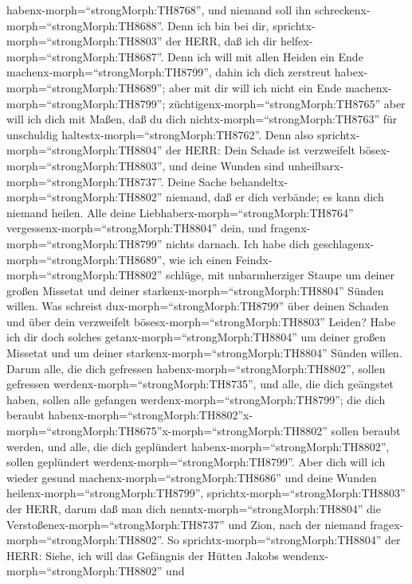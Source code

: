 habenx-morph=``strongMorph:TH8768'', und niemand soll ihn
schreckenx-morph=``strongMorph:TH8688''.  Denn ich bin bei
dir, sprichtx-morph=``strongMorph:TH8803'' der HERR, daß ich dir
helfex-morph=``strongMorph:TH8687''. Denn ich will mit allen Heiden ein
Ende machenx-morph=``strongMorph:TH8799'', dahin ich dich zerstreut
habex-morph=``strongMorph:TH8689''; aber mit dir will ich nicht ein Ende
machenx-morph=``strongMorph:TH8799'';
züchtigenx-morph=``strongMorph:TH8765'' aber will ich dich mit Maßen,
daß du dich nichtx-morph=``strongMorph:TH8763'' für unschuldig
haltestx-morph=``strongMorph:TH8762''.  Denn also
sprichtx-morph=``strongMorph:TH8804'' der HERR: Dein Schade ist
verzweifelt bösex-morph=``strongMorph:TH8803'', und deine Wunden sind
unheilbarx-morph=``strongMorph:TH8737''.  Deine Sache
behandeltx-morph=``strongMorph:TH8802'' niemand, daß er dich verbände;
es kann dich niemand heilen.  Alle deine
Liebhaberx-morph=``strongMorph:TH8764''
vergessenx-morph=``strongMorph:TH8804'' dein, und
fragenx-morph=``strongMorph:TH8799'' nichts darnach. Ich habe dich
geschlagenx-morph=``strongMorph:TH8689'', wie ich einen
Feindx-morph=``strongMorph:TH8802'' schlüge, mit unbarmherziger Staupe
um deiner großen Missetat und deiner
starkenx-morph=``strongMorph:TH8804'' Sünden willen.  Was
schreist dux-morph=``strongMorph:TH8799'' über deinen Schaden und über
dein verzweifelt bösesx-morph=``strongMorph:TH8803'' Leiden? Habe ich
dir doch solches getanx-morph=``strongMorph:TH8804'' um deiner großen
Missetat und um deiner starkenx-morph=``strongMorph:TH8804'' Sünden
willen.  Darum alle, die dich gefressen
habenx-morph=``strongMorph:TH8802'', sollen gefressen
werdenx-morph=``strongMorph:TH8735'', und alle, die dich geängstet
haben, sollen alle gefangen werdenx-morph=``strongMorph:TH8799''; die
dich beraubt
habenx-morph=``strongMorph:TH8802''\textbar x-morph=``strongMorph:TH8675''x-morph=``strongMorph:TH8802''
sollen beraubt werden, und alle, die dich geplündert
habenx-morph=``strongMorph:TH8802'', sollen geplündert
werdenx-morph=``strongMorph:TH8799''.  Aber dich will ich
wieder gesund machenx-morph=``strongMorph:TH8686'' und deine Wunden
heilenx-morph=``strongMorph:TH8799'',
sprichtx-morph=``strongMorph:TH8803'' der HERR, darum daß man dich
nenntx-morph=``strongMorph:TH8804'' die
Verstoßenex-morph=``strongMorph:TH8737'' und Zion, nach der niemand
fragex-morph=``strongMorph:TH8802''.  So
sprichtx-morph=``strongMorph:TH8804'' der HERR: Siehe, ich will das
Gefängnis der Hütten Jakobs wendenx-morph=``strongMorph:TH8802'' und
